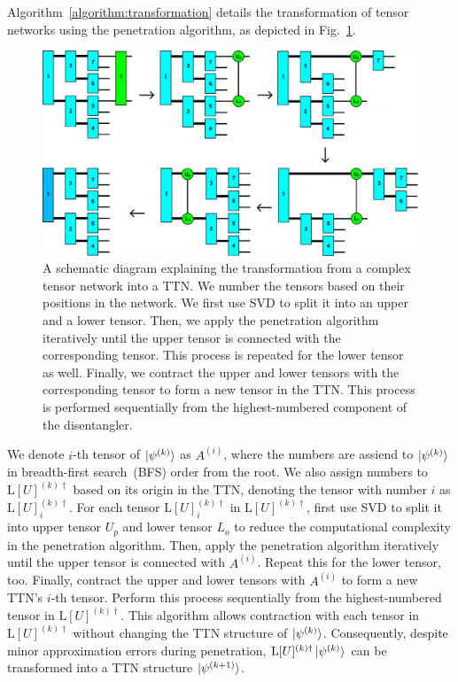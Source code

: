 \documentclass[12pt,dvipdfmx,twoside,openright]{report}
\begin{document}
Algorithm~\ref{algorithm:transformation} details the transformation of tensor networks using the penetration algorithm, as depicted in Fig.~\ref{fig:decomposition-c}.
\begin{figure}
    \centering
    \includegraphics[width=\linewidth]{fig-decomposition-c.pdf}
    \caption{A schematic diagram explaining the transformation from a complex tensor network into a TTN. We number the tensors based on their positions in the network. We first use SVD to split it into an upper and a lower tensor. Then, we apply the penetration algorithm iteratively until the upper tensor is connected with the corresponding tensor. This process is repeated for the lower tensor as well. Finally, we contract the upper and lower tensors with the corresponding tensor to form a new tensor in the TTN. This process is performed sequentially from the highest-numbered component of the disentangler.
    }
    \label{fig:decomposition-c}
\end{figure}
We denote $i$-th tensor of $\ket{\psi^{(k)}}$ as $A^{(i)}$, where the numbers are assiend to $\ket{\psi^{(k)}}$ in breadth-first search~(BFS) order from the root.
We also assign numbers to $\mathrm{L}[U]^{(k)\dagger}$ based on its origin in the TTN, denoting the tensor with number $i$ as $\mathrm{L}[U]^{(k)\dagger}_i$.
For each tensor $\mathrm{L}[U]^{(k)\dagger}_i$ in $\mathrm{L}[U]^{(k)\dagger}$, first use SVD to split it into upper tensor $U_p$ and lower tensor $L_o$ to reduce the computational complexity in the penetration algorithm.
Then, apply the penetration algorithm iteratively until the upper tensor is connected with $A^{(i)}$.
Repeat this for the lower tensor, too.
Finally, contract the upper and lower tensors with $A^{(i)}$ to form a new TTN's $i$-th tensor.
Perform this process sequentially from the highest-numbered tensor in $\mathrm{L}[U]^{(k)\dagger}$.
This algorithm allows contraction with each tensor in $\mathrm{L}[U]^{(k)\dagger}$ without changing the TTN structure of $\ket{\psi^{(k)}}$.
Consequently, despite minor approximation errors during penetration, $\mathrm{L}[U]^{(k)\dagger}\ket{\psi^{(k)}}$ can be transformed into a TTN structure $\ket{\psi^{(k+1)}}$.
\end{document}
